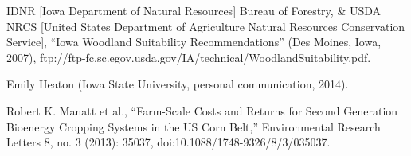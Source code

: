 \documentclass[11pt]{article}
\begin{document}
\begin{thebibliography}{1}
   IDNR [Iowa Department of Natural Resources] Bureau of Forestry, & USDA NRCS [United States Department of Agriculture Natural Resources Conservation Service], “Iowa Woodland Suitability Recommendations” (Des Moines, Iowa, 2007), ftp://ftp-fc.sc.egov.usda.gov/IA/technical/WoodlandSuitability.pdf.
   
   Emily Heaton (Iowa State University, personal communication, 2014).
   
   Robert K. Manatt et al., “Farm-Scale Costs and Returns for Second Generation Bioenergy Cropping Systems in the US Corn Belt,” Environmental Research Letters 8, no. 3 (2013): 35037, doi:10.1088/1748-9326/8/3/035037.
   
   
\end{thebibliography}
\end{document}
